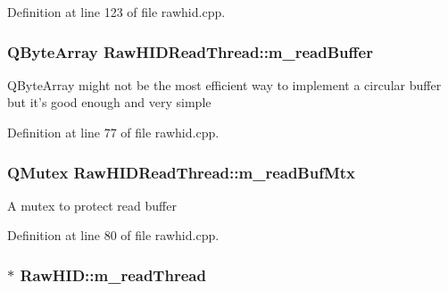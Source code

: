 \-Definition at line 123 of file rawhid.\-cpp.

\hypertarget{group___raw_h_i_d_plugin_gaab5037bdcaa413fed7fea8c575861b1b}{
\subsubsection[{m\-\_\-read\-Buffer}]{\setlength{\rightskip}{0pt plus 5cm}\-Q\-Byte\-Array {\bf \-Raw\-H\-I\-D\-Read\-Thread\-::m\-\_\-read\-Buffer}}}\label{group___raw_h_i_d_plugin_gaab5037bdcaa413fed7fea8c575861b1b}
\-Q\-Byte\-Array might not be the most efficient way to implement a circular buffer but it's good enough and very simple 

\-Definition at line 77 of file rawhid.\-cpp.

\hypertarget{group___raw_h_i_d_plugin_ga5b3754efb963cd7171d34683320c01eb}{
\subsubsection[{m\-\_\-read\-Buf\-Mtx}]{\setlength{\rightskip}{0pt plus 5cm}\-Q\-Mutex {\bf \-Raw\-H\-I\-D\-Read\-Thread\-::m\-\_\-read\-Buf\-Mtx}}}\label{group___raw_h_i_d_plugin_ga5b3754efb963cd7171d34683320c01eb}
\-A mutex to protect read buffer 

\-Definition at line 80 of file rawhid.\-cpp.

\hypertarget{group___raw_h_i_d_plugin_gaecb703f979aac429ee3961f52c998b53}{
\subsubsection[{m\-\_\-read\-Thread}]{$\ast$ {\bf \-Raw\-H\-I\-D\-::m\-\_\-read\-Thread}}}\label{group___raw_h_i_d_plugin_gaecb703f979aac429ee3961f52c998b53}


